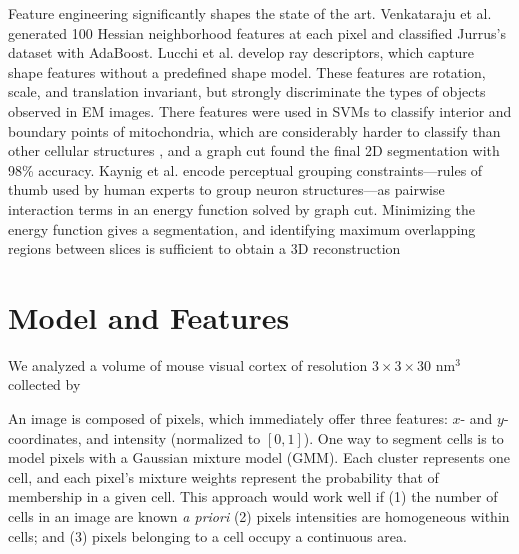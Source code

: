 \documentclass[english]{article}
\newcommand{\+}[1]{\ensuremath{\boldsymbol{\mathrm{#1}}}}
\begin{document}
Feature engineering significantly shapes the state of the art. Venkataraju et al. \cite{Venkataraju2009} generated 100 Hessian neighborhood features at each pixel and classified Jurrus's dataset with AdaBoost. Lucchi et al. \cite{Lucchi2010} develop ray descriptors, which capture shape features without a predefined shape model. These features are rotation, scale, and translation invariant, but strongly discriminate the types of objects observed in EM images. There features were used in SVMs to classify interior and boundary points of mitochondria, which are considerably harder to classify than other cellular structures \cite{Kaynig2010b}, and a graph cut found the final 2D segmentation with 98\% accuracy. Kaynig et al. encode perceptual grouping constraints---rules of thumb used by human experts to group neuron structures---as pairwise interaction terms in an energy function solved by graph cut. Minimizing the energy function gives a segmentation, and identifying maximum overlapping regions between slices is sufficient to obtain a 3D reconstruction 


\section{Model and Features}

We analyzed a  volume of mouse visual cortex of resolution $3 \times 3 \times 30 \text{ nm}^3$ collected by 

An image is composed of pixels, which immediately offer three features: $x$- and $y$- coordinates, and intensity (normalized to $[0,1]$). One way to segment cells is to model pixels with a Gaussian mixture model (GMM). Each cluster represents one cell, and each pixel's mixture weights represent the probability that of membership in a given cell. This approach would work well if (1) the number of cells in an image are known \emph{a priori} (2) pixels intensities are homogeneous within cells; and (3) pixels belonging to a cell occupy a continuous area.
\end{document}
